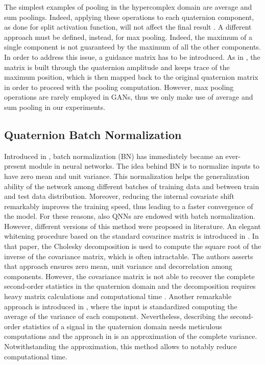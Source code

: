 \documentclass[graybox]{svmult}
\begin{document}
The simplest examples of pooling in the hypercomplex domain are average and sum poolings. Indeed, applying these operations to each quaternion component, as done for split activation function, will not affect the final result \cite{QilinQCNN2019}. A different approach must be defined, instead, for max pooling. Indeed, the maximum of a single component is not guaranteed by the maximum of all the other components. In order to address this issue, a guidance matrix has to be introduced. As in \cite{QilinQCNN2019}, the matrix is built through the quaternion amplitude and keeps trace of the maximum position, which is then mapped back to the original quaternion matrix in order to proceed with the pooling computation. However, max pooling operations are rarely employed in GANs, thus we only make use of average and sum pooling in our experiments.

\subsection{Quaternion Batch Normalization}
\noindent Introduced in \cite{IoffeBN2015}, batch normalization (BN) has immediately became an ever-present module in neural networks. The idea behind BN is to normalize inputs to have zero mean and unit variance. This normalization helps the generalization ability of the network among different batches of training data and between train and test data distribution. 
Moreover, reducing the internal covariate shift remarkably improves the training speed, thus leading to a faster convergence of the model.
For these reasons, also QNNs are endowed with batch normalization. However, different versions of this method were proposed in literature. An elegant whitening procedure based on the standard covarince matrix is introduced in \cite{GaudetIJCNN2018}. In that paper, the Cholesky decomposition is used to compute the square root of the inverse of the covariance matrix, which is often intractable. The authors asserts that approach ensures zero mean, unit variance and decorrelation among components. However, the covariance matrix is not able to recover the complete second-order statistics in the quaternion domain \cite{TookSIGPRO2011} and the decomposition requires heavy matrix calculations and computational time \cite{HoffmanAlgebraNets2020}. Another remarkable approach is introduced in \cite{VecchiTIT2020}, where the input is standardized computing the average of the variance of each component. Nevertheless, describing the second-order statistics of a signal in the quaternion domain needs meticulous computations and the approach in \cite{VecchiTIT2020} is an approximation of the complete variance. Notwithstanding the approximation, this method allows to notably reduce computational time.
\end{document}
